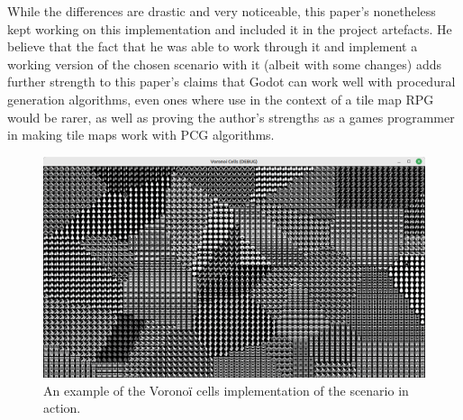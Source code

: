 While the differences are drastic and very noticeable, this paper's nonetheless kept working on this implementation and included it in the project artefacts. He believe that the fact that he was able to work through it and implement a working version of the chosen scenario with it (albeit with some changes) adds further strength to this paper's claims that Godot can work well with procedural generation algorithms, even ones where use in the context of a tile map RPG would be rarer, as well as proving the author's strengths as a games programmer in making tile maps work with PCG algorithms.

\begin{figure}[H]
    \centering
    \includegraphics[width=\textwidth]{Images/voronoi-example.png}
    \caption{An example of the Voronoï cells implementation of the scenario in action.}
    \label{fig:voronoi-example}
\end{figure}
